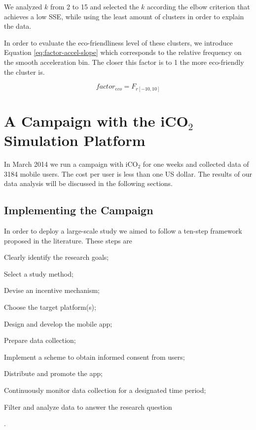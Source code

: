 \documentclass[preprint,authoryear,12pt]{elsarticle}
\begin{document}
We analyzed $k$ from 2 to 15 and selected the $k$ according the elbow criterion \cite{Thorndike.1953} that achieves a low SSE, while using the least amount of clusters in order to explain the data.

In order to evaluate the eco-friendliness level of these clusters, we introduce Equation \ref{eq:factor-accel-slope} which corresponds to the relative frequency on the smooth acceleration bin. The closer this factor is to 1 the more eco-friendly the cluster is.

\begin{equation}\label{eq:factor-accel-slope}
factor_{eco} = F_{r[-10,10]}
\end{equation}



\section{A Campaign with the iCO$_2$ Simulation Platform}\label{sec:campaign}


In March 2014 we run a campaign with iCO$_2$ for one weeks and collected data of 3184 mobile users. The cost per user is less than one US dollar.
The results of our data analysis will be discussed in the following sections.

\subsection{Implementing the Campaign}
\label{subsec:campaign}

In order to deploy a large-scale study we aimed to follow a ten-step framework proposed in the literature. These steps are \begin{inparaenum}[\itshape 1\upshape)]\item Clearly identify the research goals; \item Select a study method; \item Devise an incentive mechanism;  \item Choose the target platform(s); \item Design and develop the mobile app; \item Prepare data collection; \item Implement a scheme to obtain informed consent from users; \item Distribute and promote the app; \item Continuously monitor data collection for a designated time period; \item Filter and analyze data to answer the research question \end{inparaenum} \citep{Henze2013}.
\end{document}
